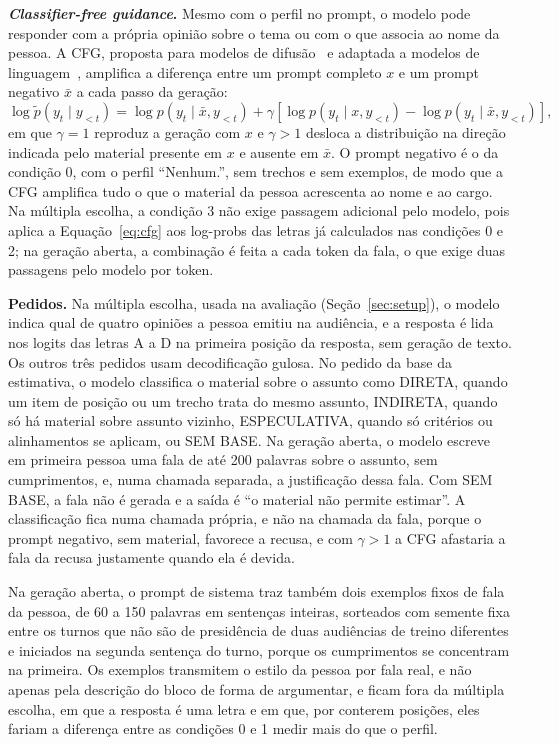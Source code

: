 \textbf{\textit{Classifier-free guidance}.} Mesmo com o perfil no prompt, o modelo pode responder com a
própria opinião sobre o tema ou com o que associa ao nome da pessoa. A CFG, proposta para modelos de
difusão~\citep{ho2022classifier} e adaptada a modelos de linguagem~\citep{sanchez2024stay}, amplifica
a diferença entre um prompt completo $x$ e um prompt negativo $\bar{x}$ a cada passo da geração:
\begin{equation}
  \log \tilde{p}(y_t \mid y_{<t}) = \log p(y_t \mid \bar{x}, y_{<t})
  + \gamma \left[ \log p(y_t \mid x, y_{<t}) - \log p(y_t \mid \bar{x}, y_{<t}) \right],
  \label{eq:cfg}
\end{equation}
em que $\gamma = 1$ reproduz a geração com $x$ e $\gamma > 1$ desloca a distribuição na direção
indicada pelo material presente em $x$ e ausente em $\bar{x}$. O prompt negativo é o da condição 0,
com o perfil ``Nenhum.'', sem trechos e sem exemplos, de modo que a CFG amplifica tudo o que o
material da pessoa acrescenta ao nome e ao cargo. Na múltipla escolha, a condição 3 não exige
passagem adicional pelo modelo, pois aplica a Equação~\ref{eq:cfg} aos log-probs das letras já
calculados nas condições 0 e 2; na geração aberta, a combinação é feita a cada token da fala, o que
exige duas passagens pelo modelo por token.

\textbf{Pedidos.} Na múltipla escolha, usada na avaliação (Seção~\ref{sec:setup}), o modelo indica
qual de quatro opiniões a pessoa emitiu na audiência, e a resposta é lida nos logits das letras A a
D na primeira posição da resposta, sem geração de texto. Os outros três pedidos usam decodificação
gulosa. No pedido da base da estimativa, o modelo classifica o material sobre o assunto como
DIRETA, quando um item de posição ou um trecho trata do mesmo assunto, INDIRETA, quando só há
material sobre assunto vizinho, ESPECULATIVA, quando só critérios ou alinhamentos se aplicam, ou SEM
BASE. Na geração aberta, o modelo escreve em primeira pessoa uma fala de até 200 palavras sobre o
assunto, sem cumprimentos, e, numa chamada separada, a justificação dessa fala. Com SEM BASE, a fala
não é gerada e a saída é ``o material não permite estimar''. A classificação fica numa chamada
própria, e não na chamada da fala, porque o prompt negativo, sem material, favorece a recusa, e com
$\gamma > 1$ a CFG afastaria a fala da recusa justamente quando ela é devida.

Na geração aberta, o prompt de sistema traz também dois exemplos fixos de fala da pessoa, de 60 a
150 palavras em sentenças inteiras, sorteados com semente fixa entre os turnos que não são de
presidência de duas audiências de treino diferentes e iniciados na segunda sentença do turno, porque
os cumprimentos se concentram na primeira. Os exemplos transmitem o estilo da pessoa por fala real, e
não apenas pela descrição do bloco de forma de argumentar, e ficam fora da múltipla escolha, em que a
resposta é uma letra e em que, por conterem posições, eles fariam a diferença entre as condições 0 e
1 medir mais do que o perfil.

